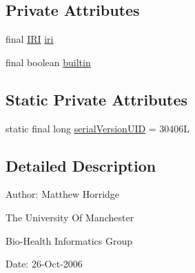 \subsection*{Private Attributes}
\begin{DoxyCompactItemize}
\item 
final \hyperlink{classorg_1_1semanticweb_1_1owlapi_1_1model_1_1_i_r_i}{I\-R\-I} \hyperlink{classuk_1_1ac_1_1manchester_1_1cs_1_1owl_1_1owlapi_1_1_o_w_l_object_property_impl_a7f5856a83ead40b3b40e31c0210f194a}{iri}
\item 
final boolean \hyperlink{classuk_1_1ac_1_1manchester_1_1cs_1_1owl_1_1owlapi_1_1_o_w_l_object_property_impl_a584f8a7e4e68a8db86dad68d2bb594ea}{builtin}
\end{DoxyCompactItemize}
\subsection*{Static Private Attributes}
\begin{DoxyCompactItemize}
\item 
static final long \hyperlink{classuk_1_1ac_1_1manchester_1_1cs_1_1owl_1_1owlapi_1_1_o_w_l_object_property_impl_ad740ce96d559aa6825fb09db30454343}{serial\-Version\-U\-I\-D} = 30406\-L
\end{DoxyCompactItemize}


\subsection{Detailed Description}
Author\-: Matthew Horridge\par
 The University Of Manchester\par
 Bio-\/\-Health Informatics Group\par
 Date\-: 26-\/\-Oct-\/2006\par
 \par
 

